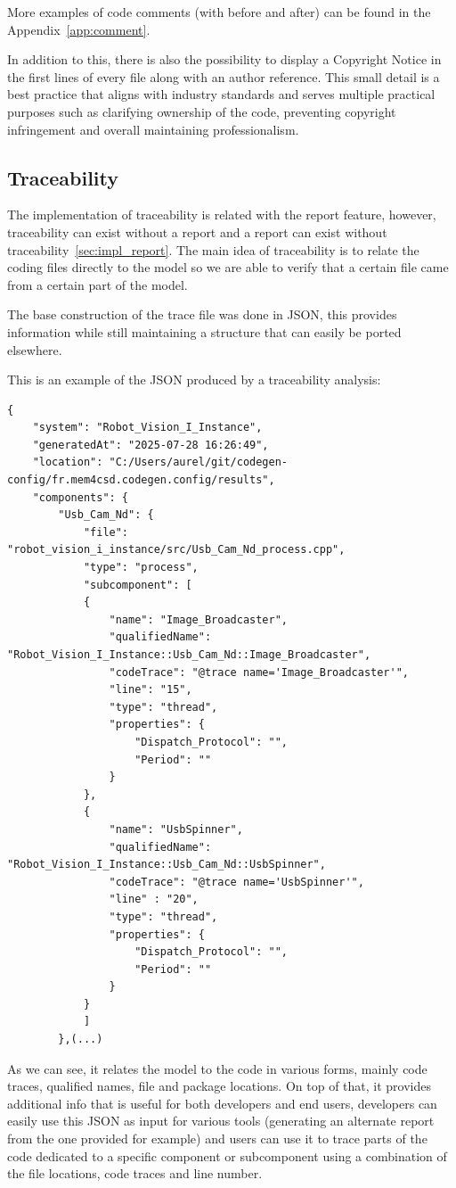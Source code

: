 More examples of code comments (with before and after) can be found in the Appendix~\ref{app:comment}.

In addition to this, there is also the possibility to display a Copyright Notice in the first lines of every file along with an author reference. This small detail is a best practice that aligns with industry standards and serves multiple practical purposes such as clarifying ownership of the code, preventing copyright infringement and overall maintaining professionalism.


\subsection{Traceability}
\label{sec:impl_trace}

The implementation of traceability is related with the report feature, however, traceability can exist without a report and a report can exist without traceability~\ref{sec:impl_report}. The main idea of traceability is to relate the coding files directly to the model so we are able to verify that a certain file came from a certain part of the model.

The base construction of the trace file was done in JSON, this provides information while still maintaining a structure that can easily be ported elsewhere.

This is an example of the JSON produced by a traceability analysis:

\begin{verbatim}
{
	"system": "Robot_Vision_I_Instance",
	"generatedAt": "2025-07-28 16:26:49",
	"location": "C:/Users/aurel/git/codegen-config/fr.mem4csd.codegen.config/results",
	"components": {
		"Usb_Cam_Nd": {
			"file": "robot_vision_i_instance/src/Usb_Cam_Nd_process.cpp",
			"type": "process",
			"subcomponent": [
			{
				"name": "Image_Broadcaster",
				"qualifiedName": "Robot_Vision_I_Instance::Usb_Cam_Nd::Image_Broadcaster",
				"codeTrace": "@trace name='Image_Broadcaster'",
				"line": "15",
				"type": "thread",
				"properties": {
					"Dispatch_Protocol": "",
					"Period": ""
				}
			},
			{
				"name": "UsbSpinner",
				"qualifiedName": "Robot_Vision_I_Instance::Usb_Cam_Nd::UsbSpinner",
				"codeTrace": "@trace name='UsbSpinner'",
				"line" : "20",
				"type": "thread",
				"properties": {
					"Dispatch_Protocol": "",
					"Period": ""
				}
			}
			]
		},(...)
\end{verbatim}

As we can see, it relates the model to the code in various forms, mainly code traces, qualified names, file and package locations. On top of that, it provides additional info that is useful for both developers and end users, developers can easily use this \gls{JSON} as input for various tools (generating an alternate report from the one provided for example) and users can use it to trace parts of the code dedicated to a specific component or subcomponent using a combination of the file locations, code traces and line number.

